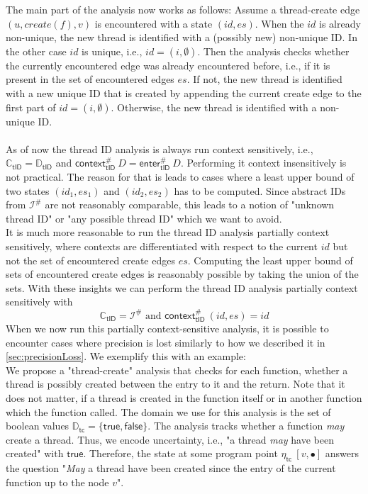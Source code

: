   The main part of the analysis now works as follows: Assume a thread-create edge $(u, create(f), v)$ is encountered with a state $(id, es)$. When the $id$ is already non-unique, the new thread is identified with a (possibly new) non-unique ID. In the other case $id$ is unique, i.e., $id = (i, \emptyset)$. Then the analysis checks whether the currently encountered edge was already encountered before, i.e., if it is present in the set of encountered edges $es$. If not, the new thread is identified with a new unique ID that is created by appending the current create edge to the first part of $id = (i, \emptyset)$. Otherwise, the new thread is identified with a non-unique ID.\\
  \\
  As of now the thread ID analysis is always run context sensitively, i.e., $\mathbb{C}_\textsf{tID} = \mathbb{D}_\textsf{tID}$ and $\textsf{context}^{\#}_\textsf{tID}\ D = \textsf{enter}^{\#}_\textsf{tID}\ D$. Performing it context insensitively is not practical. The reason for that is leads to cases where a least upper bound of two states $(id_1, es_1)$ and $(id_2, es_2)$ has to be computed. Since abstract IDs from $\mathcal{I}^{\#}$ are not reasonably comparable, this leads to a notion of "unknown thread ID" or "any possible thread ID" which we want to avoid.\\
  It is much more reasonable to run the thread ID analysis partially context sensitively, where contexts are differentiated with respect to the current $id$ but not the set of encountered create edges $es$. Computing the least upper bound of sets of encountered create edges is reasonably possible by taking the union of the sets. With these insights we can perform the thread ID analysis partially context sensitively with
  \[\mathbb{C}_\textsf{tID} = \mathcal{I}^{\#} \text{ and } \textsf{context}^{\#}_\textsf{tID}\ (id, es) = id\]
  When we now run this partially context-sensitive analysis, it is possible to encounter cases where precision is lost similarly to how we described it in \autoref{sec:precisionLoss}. We exemplify this with an example:
  \\
  We propose a "thread-create" analysis that checks for each function, whether a thread is possibly created between the entry to it and the return. Note that it does not matter, if a thread is created in the function itself or in another function which the function called. The domain we use for this analysis is the set of boolean values $\mathbb{D}_\textsf{tc} = \{\textsf{true}, \textsf{false}\}$. The analysis tracks whether a function \textit{may} create a thread. Thus, we encode uncertainty, i.e., "a thread \textit{may} have been created" with $\textsf{true}$. Therefore, the state at some program point $\eta_\textsf{tc}\ [v,\bullet]$ answers the question "\textit{May} a thread have been created since the entry of the current function up to the node $v$". 
  
